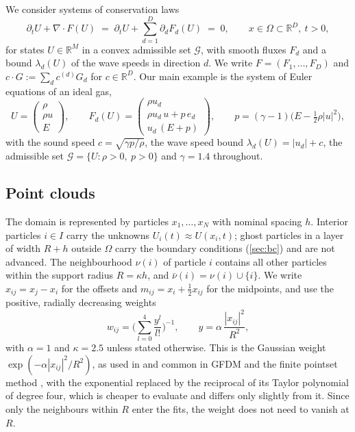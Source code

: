 \documentclass[smallextended]{svjour3}
\numberwithin{equation}{section}
\newcommand{\R}{\mathbb{R}}
\newcommand{\nb}{\nu}
\newcommand{\cnb}{\bar\nu}
\newcommand{\Ad}{\mathcal{G}}
\begin{document}
We consider systems of conservation laws
\begin{equation}\label{eq:pde}
\partial_t U + \nabla\cdot F(U) \;=\; \partial_t U + \sum_{d=1}^{D} \partial_d F_d(U) \;=\; 0, \qquad x\in\Omega\subset\R^D,\ t>0,
\end{equation}
for states $U\in\R^M$ in a convex admissible set $\Ad$, with smooth fluxes $F_d$ and a bound $\lambda_d(U)$ of the wave speeds in direction $d$. We write $F=(F_1,\dots,F_D)$ and $c\cdot G := \sum_{d} c^{(d)} G_d$ for $c\in\R^D$. Our main example is the system of Euler equations of an ideal gas,
\begin{equation}\label{eq:euler}
U = \begin{pmatrix}\rho\\ \rho u\\ E\end{pmatrix},\qquad
F_d(U) = \begin{pmatrix}\rho u_d\\ \rho u_d\, u + p\, e_d\\ u_d\,(E+p)\end{pmatrix},\qquad
p = (\gamma-1)\Big(E-\tfrac12\rho|u|^2\Big),
\end{equation}
with the sound speed $c=\sqrt{\gamma p/\rho}$, the wave speed bound $\lambda_d(U)=|u_d|+c$, the admissible set $\Ad=\{U:\rho>0,\ p>0\}$ and $\gamma=1.4$ throughout.

\subsection{Point clouds}\label{sec:cloud}

The domain is represented by particles $x_1,\dots,x_N$ with nominal spacing $h$. Interior particles $i\in I$ carry the unknowns $U_i(t)\approx U(x_i,t)$; ghost particles in a layer of width $R+h$ outside $\Omega$ carry the boundary conditions (\cref{sec:bc}) and are not advanced. The neighbourhood $\nb(i)$ of particle $i$ contains all other particles within the support radius $R=\kappa h$, and $\cnb(i)=\nb(i)\cup\{i\}$. We write $x_{ij}=x_j-x_i$ for the offsets and $m_{ij}=x_i+\tfrac12x_{ij}$ for the midpoints, and use the positive, radially decreasing weights
\begin{equation}\label{eq:weight}
w_{ij} = \Big(\sum_{l=0}^{4}\frac{y^l}{l!}\Big)^{-1},\qquad y=\alpha\,\frac{|x_{ij}|^2}{R^2},
\end{equation}
with $\alpha=1$ and $\kappa=2.5$ unless stated otherwise. This is the Gaussian weight $\exp(-\alpha|x_{ij}|^2/R^2)$, as used in \cite{Willems2025} and common in GFDM and the finite pointset method \cite{Tiwari2003}, with the exponential replaced by the reciprocal of its Taylor polynomial of degree four, which is cheaper to evaluate and differs only slightly from it. Since only the neighbours within $R$ enter the fits, the weight does not need to vanish at $R$.
\end{document}
